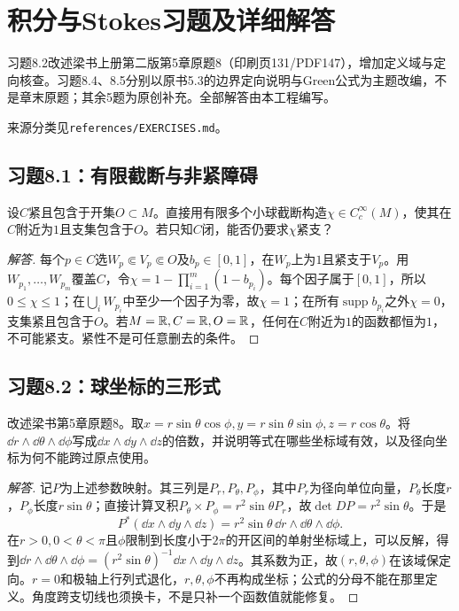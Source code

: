\section{积分与Stokes习题及详细解答}
习题8.2改述梁书上册第二版第5章原题8（印刷页131/PDF147），增加定义域与定向核查。习题8.4、8.5分别以原书5.3的边界定向说明与Green公式为主题改编，不是章末原题；其余5题为原创补充。全部解答由本工程编写。

来源分类见\texttt{references/EXERCISES.md}。

\subsection*{习题8.1：有限截断与非紧障碍}
设$C$紧且包含于开集$O\subset M$。直接用有限多个小球截断构造$\chi\in C_c^\infty(M)$，使其在$C$附近为$1$且支集包含于$O$。若只知$C$闭，能否仍要求$\chi$紧支？
\begin{proof}[解答]
每个$p\in C$选$W_p\Subset V_p\Subset O$及$b_p\in[0,1]$，在$W_p$上为$1$且紧支于$V_p$。用$W_{p_1},\ldots,W_{p_m}$覆盖$C$，令$\chi=1-\prod_{i=1}^m(1-b_{p_i})$。每个因子属于$[0,1]$，所以$0\leq\chi\leq1$；在$\bigcup_iW_{p_i}$中至少一个因子为零，故$\chi=1$；在所有$\operatorname{supp}b_{p_i}$之外$\chi=0$，支集紧且包含于$O$。若$M=\mathbb{R},C=\mathbb{R},O=\mathbb{R}$，任何在$C$附近为$1$的函数都恒为$1$，不可能紧支。紧性不是可任意删去的条件。
\end{proof}

\subsection*{习题8.2：球坐标的三形式}
改述梁书第5章原题8。取$x=r\sin\theta\cos\phi,y=r\sin\theta\sin\phi,z=r\cos\theta$。将$\dd r\wedge\dd\theta\wedge\dd\phi$写成$\dd x\wedge\dd y\wedge\dd z$的倍数，并说明等式在哪些坐标域有效，以及径向坐标为何不能跨过原点使用。
\begin{proof}[解答]
记$P$为上述参数映射。其三列是$P_r,P_\theta,P_\phi$，其中$P_r$为径向单位向量，$P_\theta$长度$r$，$P_\phi$长度$r\sin\theta$；直接计算叉积$P_\theta\times P_\phi=r^2\sin\theta P_r$，故$\det DP=r^2\sin\theta$。于是
\[
 P^*(\dd x\wedge\dd y\wedge\dd z)
 =r^2\sin\theta\,\dd r\wedge\dd\theta\wedge\dd\phi.
\]
在$r>0,0<\theta<\pi$且$\phi$限制到长度小于$2\pi$的开区间的单射坐标域上，可以反解，得到$\dd r\wedge\dd\theta\wedge\dd\phi=(r^2\sin\theta)^{-1}\dd x\wedge\dd y\wedge\dd z$。其系数为正，故$(r,\theta,\phi)$在该域保定向。$r=0$和极轴上行列式退化，$r,\theta,\phi$不再构成坐标；公式的分母不能在那里定义。角度跨支切线也须换卡，不是只补一个函数值就能修复。
\end{proof}

